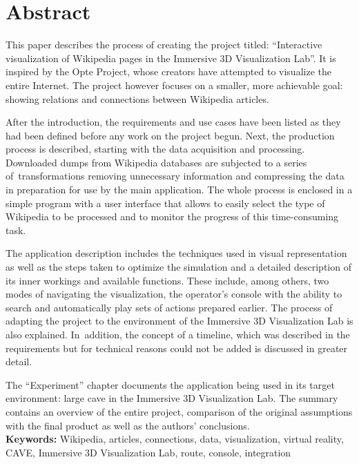 \chapter*{Abstract}
This paper describes the process of creating the project titled: ``Interactive visualization of Wikipedia pages in the Immersive 3D Visualization Lab''. It is inspired by the Opte Project, whose creators have attempted to visualize the entire Internet. The project however focuses on a smaller, more achievable goal: showing relations and connections between Wikipedia articles.

After the introduction, the requirements and use cases have been listed as they had been defined before any work on the project begun. Next, the production process is described, starting with the data acquisition and processing. Downloaded dumps from Wikipedia databases are subjected to a series of~transformations removing unnecessary information and compressing the data in preparation for use by the main application. The whole process is enclosed in a simple program with a user interface that allows to easily select the type of Wikipedia to be processed and to monitor the progress of this time-consuming task.

The application description includes the techniques used in visual representation as well as the steps taken to optimize the simulation and a detailed description of its inner workings and available functions. These include, among others, two modes of navigating the visualization, the operator's console with the ability to search and automatically play sets of actions prepared earlier. The process of adapting the project to the environment of the Immersive 3D Visualization Lab is also explained. In~addition, the concept of a timeline, which was described in the requirements but for technical reasons could not be added is discussed in greater detail.

The ``Experiment'' chapter documents the application being used in its target environment: large cave in the Immersive 3D Visualization Lab. The summary contains an overview of the entire project, comparison of the original assumptions with the final product as well as the authors' conclusions.\\

\noindent\textbf{Keywords:} Wikipedia, articles, connections, data, visualization, virtual reality, CAVE, Immersive 3D Visualization Lab, route, console, integration
